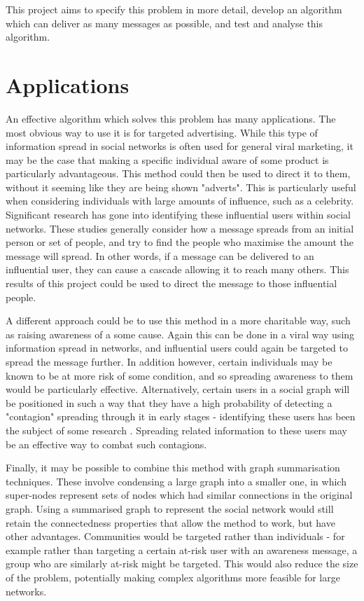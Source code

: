 \documentclass[bsc,frontabs,twoside,singlespacing,parskip,deptreport]{infthesis}     %
\begin{document}
This project aims to specify this problem in more detail, develop an algorithm which can deliver as many messages as possible, and test and analyse this algorithm.

\section{Applications}
An effective algorithm which solves this problem has many applications. The most obvious way to use it is for targeted advertising. While this type of information spread in social networks is often used for general viral marketing, it may be the case that making a specific individual aware of some product is particularly advantageous. This method could then be used to direct it to them, without it seeming like they are being shown "adverts". This is particularly useful when considering individuals with large amounts of influence, such as a celebrity. Significant research has gone into identifying these influential users within social networks\cite{InfluenceMaximisation1, InfluenceMaximisation2, LabelledInfluenceMaximisation}. These studies generally consider how a message spreads from an initial person or set of people, and try to find the people who maximise the amount the message will spread. In other words, if a message can be delivered to an influential user, they can cause a cascade allowing it to reach many others. This results of this project could be used to direct the message to those influential people.

A different approach could be to use this method in a more charitable way, such as raising awareness of a some cause. Again this can be done in a viral way using information spread in networks, and influential users could again be targeted to spread the message further. In addition however, certain individuals may be known to be at more risk of some condition, and so spreading awareness to them would be particularly effective. Alternatively, certain users in a social graph will be positioned in such a way that they have a high probability of detecting a "contagion" spreading through it in early stages - identifying these users has been the subject of some research \cite{OutbreakDetection}. Spreading related information to these users may be an effective way to combat such contagions.

Finally, it may be possible to combine this method with graph summarisation techniques\cite{GraphSummary}. These involve condensing a large graph into a smaller one, in which super-nodes represent sets of nodes which had similar connections in the original graph. Using a summarised graph to represent the social network would still retain the connectedness properties that allow the method to work, but have other advantages. Communities would be targeted rather than individuals - for example rather than targeting a certain at-risk user with an awareness message, a group who are similarly at-risk might be targeted. This would also reduce the size of the problem, potentially making complex algorithms more feasible for large networks.
\end{document}
